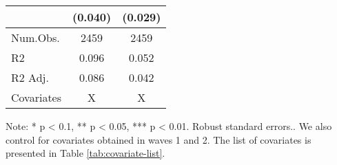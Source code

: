 \begin{table}
\begin{threeparttable}
\begin{tabular}[t]{lcc}
 & (\num{0.040}) & (\num{0.029})\\
\midrule
Num.Obs. & \num{2459} & \num{2459}\\
R2 & \num{0.096} & \num{0.052}\\
R2 Adj. & \num{0.086} & \num{0.042}\\
Covariates & X & X\\
\bottomrule
\end{tabular}
\begin{tablenotes}
\item Note: * p < 0.1, ** p < 0.05, *** p < 0.01. Robust standard errors.. We also control for covariates obtained in waves 1 and 2. The list of covariates is presented in Table \ref{tab:covariate-list}.
\end{tablenotes}
\end{threeparttable}
\end{table}

